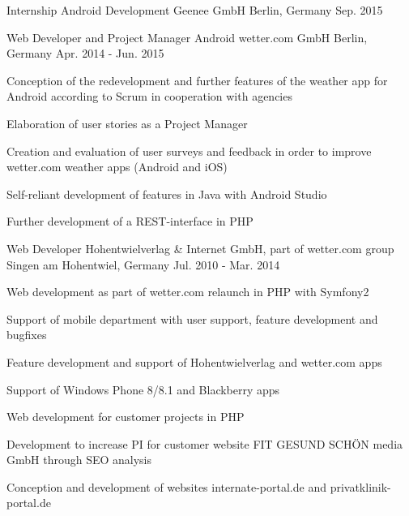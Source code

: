 \begin{cventries}
  \cventry
    {Internship Android Development} %
    {Geenee GmbH} %
    {Berlin, Germany} %
    {Sep. 2015} %
    {}

  \cventry
    {Web Developer and Project Manager Android} %
    {wetter.com GmbH} %
    {Berlin, Germany} %
    {Apr. 2014 - Jun. 2015} %
    {
      \begin{cvitems} %
        \item {Conception of the redevelopment and further features of the weather app for Android according to Scrum in cooperation with agencies}
        \item {Elaboration of user stories as a Project Manager}
        \item {Creation and evaluation of user surveys and feedback in order to improve wetter.com weather apps (Android and iOS)}
        \item {Self-reliant development of features in Java with Android Studio}
        \item {Further development of a REST-interface in PHP}
      \end{cvitems}
    }

  \cventry
    {Web Developer} %
    {Hohentwielverlag \& Internet GmbH, part of wetter.com group} %
    {Singen am Hohentwiel, Germany} %
    {Jul. 2010 - Mar. 2014} %
    {
      \begin{cvitems} %
        \item {Web development as part of wetter.com relaunch in PHP with Symfony2}
        \item {Support of mobile department with user support, feature development and bugfixes}
        \item {Feature development and support of Hohentwielverlag and wetter.com apps}
        \item {Support of Windows Phone 8/8.1 and Blackberry apps}
        \item {Web development for customer projects in PHP}
        \item {Development to increase PI for customer website FIT GESUND SCHÖN media GmbH through SEO analysis}
        \item {Conception and development of websites internate-portal.de and privatklinik-portal.de}
      \end{cvitems}
    }
    

\end{cventries}
